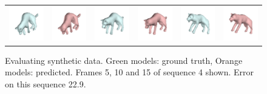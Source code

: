   \begin{figure}[t!]
  \begin{tabular}{cccccc}
  \includegraphics[width=0.16\linewidth]{synth_pipeline_45/gt_fit_cropped.png} & 
  \includegraphics[width=0.16\linewidth]{synth_pipeline_45/3d_fit_cropped.png} &
  
  \includegraphics[width=0.16\linewidth]{synth_pipeline_50/gt_fit_cropped.png} &
  \includegraphics[width=0.16\linewidth]{synth_pipeline_50/3d_fit_cropped.png} &
  
  \includegraphics[width=0.16\linewidth]{synth_pipeline_55/gt_fit_cropped.png} &
  \includegraphics[width=0.16\linewidth]{synth_pipeline_55/3d_fit_cropped.png} \\
  \end{tabular}
  \caption{Evaluating synthetic data. Green models: ground truth, Orange models: predicted. Frames 5, 10 and 15 of sequence 4 shown. Error on this sequence 22.9.}
  \label{fig:synth}
  \end{figure}
  
